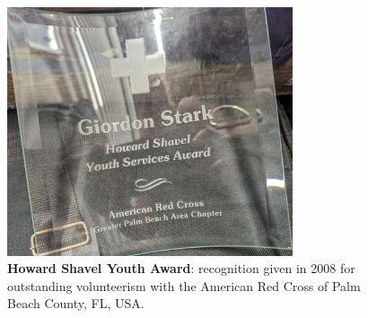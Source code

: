 \begin{figure}[h!]
	\centering
	\caption{\textbf{Howard Shavel Youth Award}: recognition given in 2008 for outstanding volunteerism with the American Red Cross of Palm Beach County, FL, USA.}
	\includegraphics[width=0.75\textwidth]{attachments/G-outreach/howardShavelYouthAward}
\end{figure}


